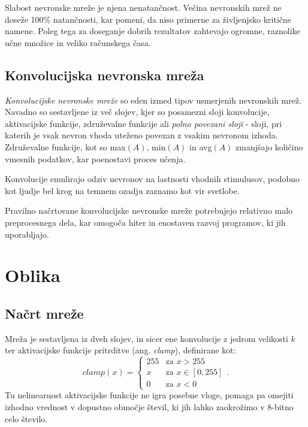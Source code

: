 \documentclass[a4paper,11pt]{article}
\begin{document}
Slabost nevronske mreže je njena nenatančnost.
Večina nevronskih mrež ne doseže 100\% natančnosti, kar pomeni, da niso primerne za življenjsko kritične namene.
Poleg tega za doseganje dobrih rezultatov zahtevajo ogromne, raznolike učne množice in veliko računskega časa.\cite{ann_compute}

\subsection{Konvolucijska nevronska mreža}

\emph{Konvolucijske nevronske mreže} so eden izmed tipov usmerjenih nevronskih mrež.
Navadno so sestavljene iz več slojev, kjer so posamezni sloji konvolucije, aktivacijske funkcije, združevalne funkcije ali
	\emph{polno povezani sloji} - sloji, pri katerih je vsak nevron vhoda uteženo povezan z vsakim nevronom izhoda.
Združevalne funkcije, kot so max$(A)$, min$(A)$ in avg$(A)$ zmanjšajo količino vmesnih podatkov, kar poenostavi proces učenja.\cite{cnn_pool}

Konvolucije emulirajo odziv nevronov na lastnosti vhodnih stimulusov, podobno kot ljudje bel krog na temnem ozadju zaznamo kot
	vir svetlobe.\cite{cnn_conv}

Pravilno načrtovane konvolucijske nevronske mreže potrebujejo relativno malo preprocesnega dela, kar omogoča hiter in enostaven razvoj programov,
	ki jih uporabljajo.

\section{Oblika}

\subsection{Načrt mreže}

Mreža je sestavljena iz dveh slojev, in sicer ene konvolucije z jedrom velikosti $k$ ter aktivacijske funkcije pritrditve (ang. \emph{clamp}),
	definirane kot:
\begin{equation*} 
clamp(x) = \begin{cases}
	255 & \text{za } x > 255 \\
	x & \text{za } x \in [0, 255] \\
	0 & \text{za } x < 0
\end{cases}.
\end{equation*}
Tu nelinearnost aktivacijske funkcije ne igra posebne vloge, pomaga pa omejiti izhodno vrednost v dopustno območje števil, ki jih lahko zaokrožimo v
	8-bitno celo število.
\end{document}
